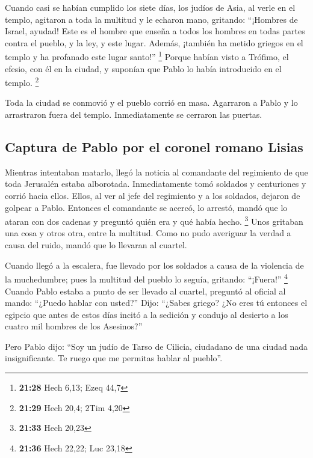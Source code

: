  Cuando casi se habían cumplido los siete días, los
judíos de Asia, al verle en el templo, agitaron a toda la multitud y le
echaron mano,  gritando: ``¡Hombres de Israel, ayudad!
Este es el hombre que enseña a todos los hombres en todas partes contra
el pueblo, y la ley, y este lugar. Además, ¡también ha metido griegos en
el templo y ha profanado este lugar santo!'' \footnote{\textbf{21:28}
  Hech 6,13; Ezeq 44,7}  Porque habían visto a Trófimo,
el efesio, con él en la ciudad, y suponían que Pablo lo había
introducido en el templo. \footnote{\textbf{21:29} Hech 20,4; 2Tim 4,20}

 Toda la ciudad se conmovió y el pueblo corrió en masa.
Agarraron a Pablo y lo arrastraron fuera del templo. Inmediatamente se
cerraron las puertas.

\hypertarget{captura-de-pablo-por-el-coronel-romano-lisias}{%
\subsection{Captura de Pablo por el coronel romano
Lisias}\label{captura-de-pablo-por-el-coronel-romano-lisias}}

 Mientras intentaban matarlo, llegó la noticia al
comandante del regimiento de que toda Jerusalén estaba alborotada.
 Inmediatamente tomó soldados y centuriones y corrió
hacia ellos. Ellos, al ver al jefe del regimiento y a los soldados,
dejaron de golpear a Pablo.  Entonces el comandante se
acercó, lo arrestó, mandó que lo ataran con dos cadenas y preguntó quién
era y qué había hecho. \footnote{\textbf{21:33} Hech 20,23}
 Unos gritaban una cosa y otros otra, entre la multitud.
Como no pudo averiguar la verdad a causa del ruido, mandó que lo
llevaran al cuartel.

 Cuando llegó a la escalera, fue llevado por los soldados
a causa de la violencia de la muchedumbre;  pues la
multitud del pueblo lo seguía, gritando: ``¡Fuera!'' \footnote{\textbf{21:36}
  Hech 22,22; Luc 23,18}  Cuando Pablo estaba a punto de
ser llevado al cuartel, preguntó al oficial al mando: ``¿Puedo hablar
con usted?'' Dijo: ``¿Sabes griego?  ¿No eres tú entonces
el egipcio que antes de estos días incitó a la sedición y condujo al
desierto a los cuatro mil hombres de los Asesinos?''

 Pero Pablo dijo: ``Soy un judío de Tarso de Cilicia,
ciudadano de una ciudad nada insignificante. Te ruego que me permitas
hablar al pueblo''.

